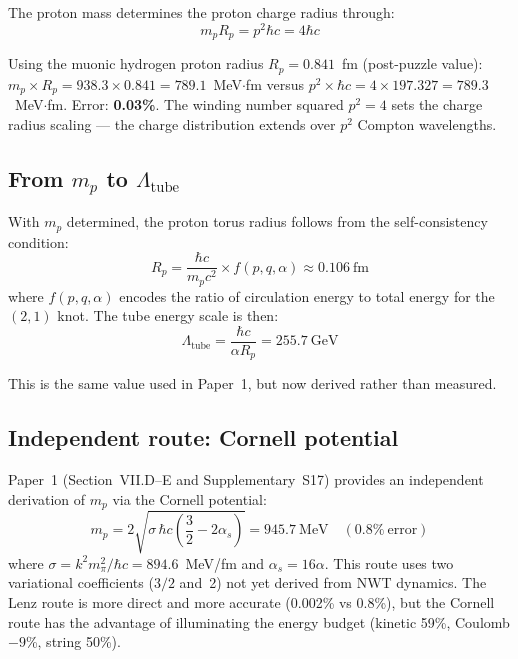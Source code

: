 \documentclass[11pt,a4paper]{article}
\begin{document}
The proton mass determines the proton charge radius through:
\begin{equation}
  m_p R_p = p^2 \hbar c = 4\hbar c
  \label{eq:charge-radius}
\end{equation}

Using the muonic hydrogen proton radius $R_p = 0.841$~fm (post-puzzle value): $m_p \times R_p = 938.3 \times 0.841 = 789.1$~MeV$\cdot$fm versus $p^2 \times \hbar c = 4 \times 197.327 = 789.3$~MeV$\cdot$fm. Error: \textbf{0.03\%}. The winding number squared $p^2 = 4$ sets the charge radius scaling --- the charge distribution extends over $p^2$ Compton wavelengths.

\subsection{From $m_p$ to $\Lambda_{\text{tube}}$}

With $m_p$ determined, the proton torus radius follows from the self-consistency condition:
\begin{equation}
  R_p = \frac{\hbar c}{m_p c^2} \times f(p,q,\alpha) \approx 0.106~\text{fm}
\end{equation}
where $f(p,q,\alpha)$ encodes the ratio of circulation energy to total energy for the $(2,1)$ knot. The tube energy scale is then:
\begin{equation}
  \Lambda_{\text{tube}} = \frac{\hbar c}{\alpha R_p} = 255.7~\text{GeV}
  \label{eq:tube-scale}
\end{equation}

This is the same value used in Paper~1, but now derived rather than measured.

\subsection{Independent route: Cornell potential}

Paper~1 (Section~VII.D--E and Supplementary~S17) provides an independent derivation of $m_p$ via the Cornell potential:
\begin{equation}
  m_p = 2\sqrt{\sigma\,\hbar c\!\left(\frac{3}{2} - 2\alpha_s\right)} = 945.7~\text{MeV} \quad (0.8\%~\text{error})
\end{equation}
where $\sigma = k^2 m_\pi^2/\hbar c = 894.6$~MeV/fm and $\alpha_s = 16\alpha$. This route uses two variational coefficients ($3/2$ and~2) not yet derived from NWT dynamics. The Lenz route is more direct and more accurate (0.002\% vs 0.8\%), but the Cornell route has the advantage of illuminating the energy budget (kinetic 59\%, Coulomb $-9$\%, string 50\%).
\end{document}
